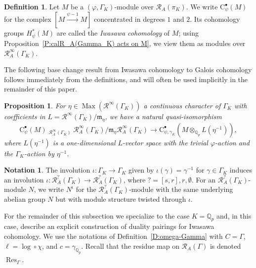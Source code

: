 \documentclass[12pt]{article}
\newtheorem{prop}[theorem]{Proposition}
\theoremstyle{definition}
\newtheorem{defn}[theorem]{Definition}
\newtheorem{notation}[theorem]{Notation}
\numberwithin{equation}{theorem}
\newcommand{\calR}{\mathcal{R}}
\newcommand{\gothm}{\mathfrak{m}}
\newcommand{\QQ}{\mathbb{Q}}
\newcommand{\bbL}{\mathbf{L}}
\newcommand{\rmC}{\mathrm{C}}
\def\Qp{\QQ_p}
\newcommand{\Lotimes}{\mathop{\stackrel{\bbL}{\otimes}}}
\DeclareMathOperator{\Max}{Max}
\DeclareMathOperator{\Res}{Res}
\begin{document}
\begin{defn}
\label{D:Iwasawa cohomology}
Let $M$ be a $(\varphi, \Gamma_K)$-module over $\calR_A(\pi_K)$.  We
write $\rmC^\bullet_\psi(M)$ for the complex $[M
  \xrightarrow{\psi-1}M]$ concentrated in degrees $1$ and $2$.  Its
cohomology groups $H^*_\psi(M)$ are called the \emph{Iwasawa
  cohomology} of $M$; using Proposition~\ref{P:calR_A(Gamma_K) acts on
  M}, we view them as modules over $\calR_A^\infty(\Gamma_K)$.
\end{defn}

The following base change result from Iwasawa cohomology to Galois cohomology follows immediately from the definitions, and will often be used implicitly in the remainder of this paper.

\begin{prop}
\label{P:psi-gamma complex v.s. psi-complex}
For $\eta \in \Max(\calR^\infty(\Gamma_K))$ a continuous character of $\Gamma_K$ with coefficients in $L = \calR^\infty(\Gamma_K)/\gothm_\eta$, we have a natural quasi-isomorphism
\begin{equation}
\label{E:psi-gamma complex v.s. psi-complex}
\rmC^\bullet_\psi(M) \Lotimes_{\calR^\infty_A(\Gamma_K)}
\calR^\infty_A(\Gamma_K)/\gothm_\eta \calR^\infty_A(\Gamma_K)
\longrightarrow \rmC^\bullet_{\psi, \gamma_K}(M \otimes_{\Qp} L(\eta^{-1})),
\end{equation}
where $L(\eta^{-1})$ is a one-dimensional $L$-vector space with the trivial $\varphi$-action and the $\Gamma_K$-action by $\eta^{-1}$.
\end{prop}


\begin{notation}
The involution $\iota: \Gamma_K \to \Gamma_K$ given by $\iota(\gamma)
= \gamma^{-1}$ for $\gamma \in \Gamma_K$ induces an involution $\iota:
\calR_A^?(\Gamma_K) \to \calR_A^?(\Gamma_K)$, where $? =
     [s,r],r,\emptyset$.  For an $\calR_A^?(\Gamma_K)$-module $N$, we
     write $N^\iota$ for the $\calR_A^?(\Gamma_K)$-module with the
     same underlying abelian group $N$ but with module structure
     twisted through $\iota$.
\end{notation}

For the remainder of this subsection we specialize to the case $K=\Qp$
and, in this case, describe an explicit construction of duality
pairings for Iwasawa cohomology.  We use the notations of
Definition~\ref{D:omega-Gamma} with $C=\Gamma$, $\ell = \log \circ
\chi$, and $c=\gamma_{\Qp}$.  Recall that the residue map on
$\calR_A(\Gamma)$ is denoted $\Res_\Gamma$.
\end{document}
